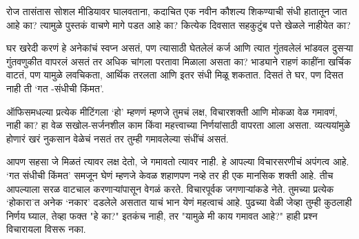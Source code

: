 रोज तासंतास सोशल मीडियावर घालवताना, कदाचित एक नवीन कौशल्य शिकण्याची संधी हातातून जात आहे का? त्यामुळे पुस्तकं वाचणे मागे पडत आहे का? कित्येक दिवसात सहकुटुंब पत्ते खेळले नाहीयेत का? 

घर खरेदी करणं हे अनेकांचं स्वप्न असतं, पण त्यासाठी घेतलेलं कर्ज आणि त्यात गुंतवलेलं भांडवल दुसऱ्या गुंतवणुकीत वापरलं असतं तर अधिक चांगला परतावा मिळाला असता का? भाड्याने राहणं काहींना खर्चिक वाटतं, पण यामुळे लवचिकता, आर्थिक तरलता आणि इतर संधी मिळू शकतात. दिसतं ते घर, पण दिसत नाही ती ‘गत -संधीची किंमत’.

ऑफिसमधल्या प्रत्येक मीटिंगला ‘हो’ म्हणणं म्हणजे तुमचं लक्ष, विचारशक्ती आणि मोकळा वेळ गमावणं, नाही का? हा वेळ सखोल-सर्जनशील काम किंवा महत्त्वाच्या निर्णयांसाठी वापरता आला असता. व्यत्ययांमुळे होणारं खरं नुकसान वेळेचं नसतं तर तुम्ही गमावलेल्या संधींचं असतं.

आपण सहसा जे मिळतं त्यावर लक्ष देतो, जे गमावतो त्यावर नाही. हे आपल्या विचारसरणीचं अपंगत्व आहे. ‘गत संधीची किंमत’ समजून घेणं म्हणजे केवळ शहाणपण नव्हे तर ही एक मानसिक शक्ती आहे. तीच आपल्याला सरळ वाटचाल करणाऱ्यांपासून वेगळं करते. विचारपूर्वक जगणाऱ्यांकडे नेते. तुमच्या प्रत्येक ‘होकारा’त अनेक ‘नकार’ दडलेले असतात याचं भान येणं महत्वाचं आहे. पुढच्या वेळी जेव्हा तुम्ही कुठलाही निर्णय घ्याल, तेव्हा फक्त "हे का?" इतकंच नाही, तर "यामुळे मी काय गमावत आहे?" हाही प्रश्न विचारायला विसरू नका.
